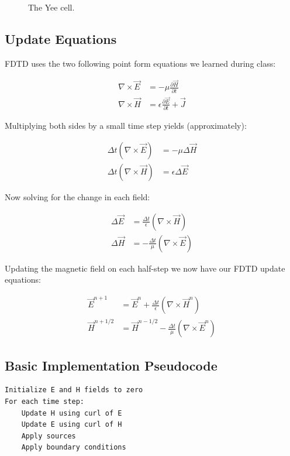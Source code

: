 \documentclass[12pt]{article}
\begin{document}
\begin{spacing}{1.5}
\begin{figure}
\begin{tikzpicture}[scale=4, thick]
	\end{tikzpicture}
    \caption{The Yee cell.}
\end{figure}

\FloatBarrier

\subsection{Update Equations}

FDTD uses the two following point form equations we learned during class:

\begin{align}
\nabla \times \vec{E} &= -\mu \frac{\partial \vec{H}}{\partial t} \\
\nabla \times \vec{H} &= \epsilon \frac{\partial \vec{E}}{\partial t} + \vec{J}
\end{align}

Multiplying both sides by a small time step yields (approximately):

\begin{align}
\Delta t(\nabla \times \vec{E}) &= -\mu \Delta \vec{H} \\
\Delta t(\nabla \times \vec{H}) &= \epsilon \Delta \vec{E}
\end{align}

Now solving for the change in each field:

\begin{align}
\Delta\vec{E} &= \frac{\Delta t}{\epsilon} (\nabla \times \vec{H}) \\
\Delta\vec{H} &= -\frac{\Delta t}{\mu} (\nabla \times \vec{E})
\end{align}

Updating the magnetic field on each half-step we now have our FDTD update equations:

\begin{align}
\vec{E}^{n+1} &= \vec{E}^n + \frac{\Delta t}{\epsilon} (\nabla \times \vec{H}^n) \\
\vec{H}^{n+1/2} &= \vec{H}^{n-1/2} - \frac{\Delta t}{\mu} (\nabla \times \vec{E}^n)
\end{align}

\subsection{Basic Implementation Pseudocode}
\begin{verbatim}
Initialize E and H fields to zero
For each time step:
    Update H using curl of E
    Update E using curl of H
    Apply sources
    Apply boundary conditions
\end{verbatim}


\end{spacing}
\end{document}
